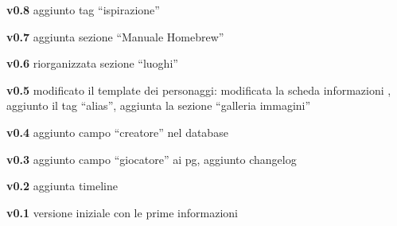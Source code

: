 \textbf{v0.8} aggiunto tag ``ispirazione''

\textbf{v0.7} aggiunta sezione ``Manuale Homebrew''

\textbf{v0.6} riorganizzata sezione ``luoghi''

\textbf{v0.5} modificato il template dei personaggi: modificata la
scheda informazioni , aggiunto il tag ``alias'', aggiunta la sezione
``galleria immagini''

\textbf{v0.4} aggiunto campo ``creatore'' nel database

\textbf{v0.3} aggiunto campo ``giocatore'' ai pg, aggiunto changelog

\textbf{v0.2} aggiunta timeline

\textbf{v0.1} versione iniziale con le prime informazioni
